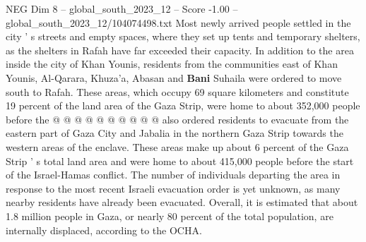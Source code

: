 \begin{textsample}{NEG Dim 8 – global\_south\_2023\_12 – Score -1.00 – global\_south\_2023\_12/104074498.txt}
Most newly arrived people settled in the city ' s streets and empty spaces, where they set up tents and temporary shelters, as the shelters in Rafah have far exceeded their capacity.
In addition to the area inside the city of Khan Younis, residents from the communities east of Khan Younis, Al-Qarara, Khuza'a, Abasan and \textbf{Bani} Suhaila were ordered to move south to Rafah.
These areas, which occupy 69 square kilometers and constitute 19 percent of the land area of the Gaza Strip, were home to about 352,000 people before the @ @ @ @ @ @ @ @ @ @ also ordered residents to evacuate from the eastern part of Gaza City and Jabalia in the northern Gaza Strip towards the western areas of the enclave.
These areas make up about 6 percent of the Gaza Strip ' s total land area and were home to about 415,000 people before the start of the Israel-Hamas conflict.
The number of individuals departing the area in response to the most recent Israeli evacuation order is yet unknown, as many nearby residents have already been evacuated.
Overall, it is estimated that about 1.8 million people in Gaza, or nearly 80 percent of the total population, are internally displaced, according to the OCHA.

\end{textsample}
